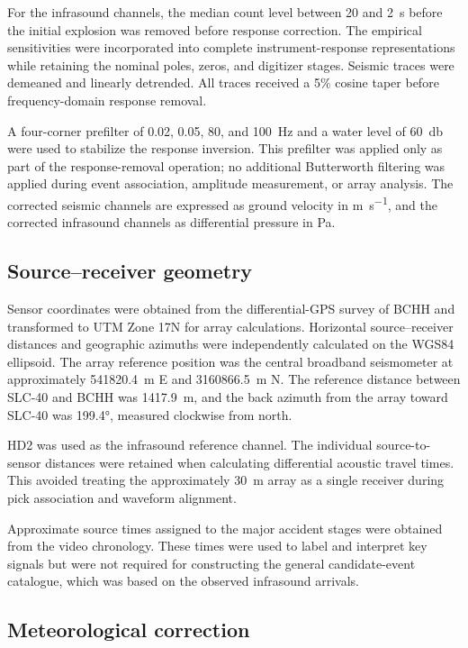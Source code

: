 \documentclass[12pt]{article}
\begin{document}
For the infrasound channels, the median count level between 20 and \SI{2}{\second}
before the initial explosion was removed before response correction. The
empirical sensitivities were incorporated into complete instrument-response
representations while retaining the nominal poles, zeros, and digitizer stages.
Seismic traces were demeaned and linearly detrended. All traces received a 5\%
cosine taper before frequency-domain response removal.

A four-corner prefilter of 0.02, 0.05, 80, and \SI{100}{\hertz} and a water level
of \SI{60}{\decibel} were used to stabilize the response inversion. This
prefilter was applied only as part of the response-removal operation; no
additional Butterworth filtering was applied during event association, amplitude
measurement, or array analysis. The corrected seismic channels are expressed as
ground velocity in \si{\metre\per\second}, and the corrected infrasound channels
as differential pressure in \si{\pascal}.

\subsection{Source--receiver geometry}

Sensor coordinates were obtained from the differential-GPS survey of BCHH and
transformed to UTM Zone 17N for array calculations. Horizontal source--receiver
distances and geographic azimuths were independently calculated on the WGS84
ellipsoid. The array reference position was the central broadband seismometer at
approximately \SI{541820.4}{\metre} E and \SI{3160866.5}{\metre} N. The reference
distance between SLC-40 and BCHH was \SI{1417.9}{\metre}, and the back azimuth
from the array toward SLC-40 was \ang{199.4}, measured clockwise from north.

HD2 was used as the infrasound reference channel. The individual
source-to-sensor distances were retained when calculating differential acoustic
travel times. This avoided treating the approximately \SI{30}{\metre} array as a
single receiver during pick association and waveform alignment.

Approximate source times assigned to the major accident stages were obtained
from the video chronology. These times were used to label and interpret key
signals but were not required for constructing the general candidate-event
catalogue, which was based on the observed infrasound arrivals.

\subsection{Meteorological correction}
\end{document}
